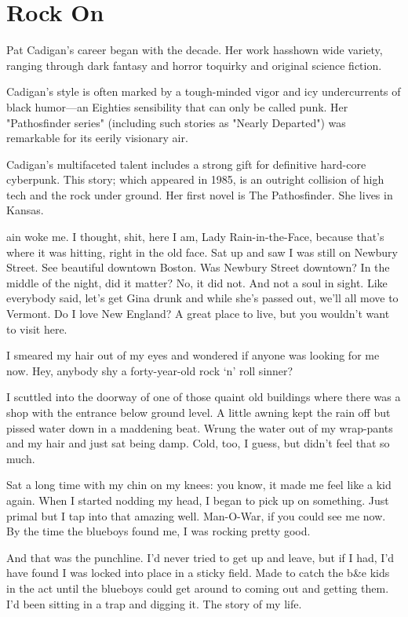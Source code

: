 \chapter{Rock On}

Pat Cadigan's career began with the decade. Her work hasshown wide variety, ranging through dark fantasy and horror toquirky and original science fiction.

Cadigan's style is often marked by a tough-minded vigor and icy undercurrents of black humor—an Eighties sensibility that can only be called punk. Her "Pathosfinder series" (including such stories as "Nearly Departed") was remarkable for its eerily visionary air.

Cadigan's multifaceted talent includes a strong gift for definitive hard-core cyberpunk. This story; which appeared in 1985, is an outright collision of high tech and the rock under ground.
Her first novel is The Pathosfinder. She lives in Kansas.

\hrulefill

ain woke me. I thought, shit, here I am, Lady Rain-in-the-Face, because that's where it was hitting, right in the old face. Sat up and saw I was still on Newbury Street. See beautiful downtown Boston. Was Newbury Street downtown? In the middle of the night, did it matter? No, it did not. And not a soul in sight. Like everybody said, let's get Gina drunk and while she's passed out, we'll all move to Vermont. Do I love New England? A great place to live, but you wouldn't want to visit here.

I smeared my hair out of my eyes and wondered if anyone was looking for me now. Hey, anybody shy a forty-year-old rock ‘n' roll sinner?

I scuttled into the doorway of one of those quaint old buildings where there was a shop with the entrance below ground level. A little awning kept the rain off but pissed water down in a maddening beat. Wrung the water out of my wrap-pants and my hair and just sat being damp. Cold, too, I guess, but didn't feel that so much.

Sat a long time with my chin on my knees: you know, it made me feel like a kid again. When I started nodding my head, I began to pick up on something. Just primal but I tap into that amazing well. Man-O-War, if you could see me now. By the time the blueboys found me, I was rocking pretty good.

And that was the punchline. I'd never tried to get up and leave, but if I had, I'd have found I was locked into place in a sticky field. Made to catch the b\&e kids in the act until the blueboys could get around to coming out and getting them. I'd been sitting in a trap and digging it. The story of my life.

